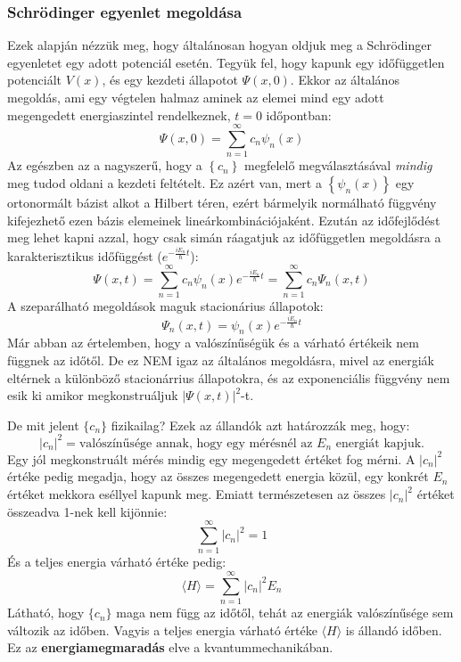 \documentclass[../main.tex]{subfiles}
\begin{document}
\subsubsection{Schrödinger egyenlet megoldása}
Ezek alapján nézzük meg, hogy általánosan hogyan oldjuk meg a Schrödinger egyenletet egy adott potenciál esetén. Tegyük fel, hogy kapunk egy időfüggetlen potenciált $V(x)$, és egy kezdeti állapotot $\Psi(x,0)$.
Ekkor az általános megoldás, ami egy végtelen halmaz aminek az elemei mind egy adott megengedett energiaszintel rendelkeznek, $t=0$ időpontban:
\begin{equation}
    \Psi(x, 0) = \sum_{n=1}^{\infty} c_n \psi_n(x)
\end{equation}
Az egészben az a nagyszerű, hogy a $\left\{c_n\right\}$ megfelelő megválasztásával \textit{mindig} meg tudod oldani a kezdeti feltételt. Ez azért van, mert a $\left\{\psi_n(x)\right\}$ egy ortonormált bázist alkot a Hilbert téren, ezért bármelyik normálható függvény kifejezhető ezen bázis elemeinek lineárkombinációjaként.
Ezután az időfejlődést meg lehet kapni azzal, hogy csak simán ráagatjuk az időfüggetlen megoldásra a karakterisztikus időfüggést ($e^{-\frac{i E_n}{\hbar} t}$):
\begin{equation}
    \boxed{\Psi(x, t) = \sum_{n=1}^{\infty} c_n \psi_n(x) e^{-\frac{i E_n}{\hbar} t} = \sum_{n=1}^{\infty} c_n \Psi_n(x, t)}
\end{equation}
A szeparálható megoldások maguk stacionárius állapotok:
\begin{equation}
    \Psi_n(x, t) = \psi_n(x) e^{-\frac{i E_n}{\hbar} t}
\end{equation}
Már abban az értelemben, hogy a valószínűségük és a várható értékeik nem függnek az időtől. De ez NEM igaz az általános megoldásra, mivel az energiák eltérnek a különböző stacionárrius állapotokra, és az exponenciális függvény nem esik ki amikor megkonstruáljuk $|\Psi(x,t)|^2$-t.

De mit jelent $\{c_n\}$ fizikailag? Ezek az állandók azt határozzák meg, hogy:
\begin{equation}
    \boxed{|c_n|^2 = \text{valószínűsége annak, hogy egy mérésnél az } E_n \text{ energiát kapjuk.}}
\end{equation}
Egy jól megkonstruált mérés mindig egy megengedett értéket fog mérni. A $|c_n|^2$ értéke pedig megadja, hogy az összes megengedett energia közül, egy konkrét $E_n$ értéket mekkora eséllyel kapunk meg.
Emiatt természetesen az összes $|c_n|^2$ értéket összeadva 1-nek kell kijönnie:
\begin{equation}
    \boxed{\sum_{n=1}^{\infty} |c_n|^2 = 1}
\end{equation}
És a teljes energia várható értéke pedig:
\begin{equation}
    \boxed{\langle H \rangle = \sum_{n=1}^{\infty} |c_n|^2 E_n}
\end{equation}
Látható, hogy $\{c_n\}$ maga nem függ az időtől, tehát az energiák valószínűsége sem változik az időben. Vagyis a teljes energia várható értéke $\langle H \rangle$ is állandó időben. Ez az 
\textbf{energiamegmaradás} elve a kvantummechanikában.
\end{document}
